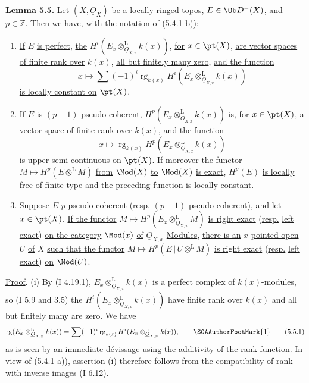 \textbf{Lemma 5.5.} \uline{Let} \((X,\underline{O}_X)\) \uline{be a locally ringed topos}, \(E\in\Ob D^{-}(X)\), \uline{and} \(p\in\mathbb Z\). \uline{Then we have}, \uline{with the notation of} (5.4.1 b)):
\begin{enumerate}[label=(\roman*)]
\item{}%
\uline{If} \(E\) \uline{is perfect}, \uline{the} \(H^i(E_x\otimes_{\underline{O}_{X,x}}^{\mathrm L}k(x))\), \uline{for} \(x\in\pt(X)\), \uline{are vector spaces of finite rank over} \(k(x)\), \uline{all but finitely many zero}, \uline{and the function}
\[
 x\longmapsto\sum(-1)^i\operatorname{rg}_{k(x)}H^i(E_x\otimes_{\underline{O}_{X,x}}^{\mathrm L}k(x))
\]
\uline{is locally constant on} \(\pt(X)\).
\item \uline{If} \(E\) \uline{is} \((p-1)\)-\uline{pseudo-coherent}, \(H^p(E_x\otimes_{\underline{O}_{X,x}}^{\mathrm L}k(x))\) \uline{is}, \uline{for} \(x\in\pt(X)\), \uline{a vector space of finite rank over} \(k(x)\), \uline{and the function}
\[
 x\longmapsto\operatorname{rg}_{k(x)}H^p(E_x\otimes_{\underline{O}_{X,x}}^{\mathrm L}k(x))
\]
\uline{is upper semi-continuous on} \(\pt(X)\). \uline{If moreover the functor} \(M\mapsto H^p(E\otimes^{\mathrm L}M)\) \uline{from} \(\Mod(X)\) \uline{to} \(\Mod(X)\) \uline{is exact}, \(H^p(E)\) \uline{is locally free of finite type and the preceding function is locally constant}.
\item \uline{Suppose} \(E\) \(p\)-\uline{pseudo-coherent} (\uline{resp.} \((p-1)\)-\uline{pseudo-coherent}), \uline{and let} \(x\in\pt(X)\). \uline{If the functor} \(M\mapsto H^p(E_x\otimes_{\underline{O}_{X,x}}^{\mathrm L}M)\) \uline{is right exact} (\uline{resp.} \uline{left exact}) \uline{on the category} \(\Mod(x)\) \uline{of} \(\underline{O}_{X,x}\)-\uline{Modules}, \uline{there is an} \(x\)-\uline{pointed open} \(U\) \uline{of} \(X\) \uline{such that the functor} \(M\mapsto H^p(E\,|\,U\otimes^{\mathrm L}M)\) \uline{is right exact} (\uline{resp.} \uline{left exact}) \uline{on} \(\Mod(U)\).
\end{enumerate}

\uline{Proof}. (i) By (I 4.19.1), \(E_x\otimes_{\underline{O}_{X,x}}^{\mathrm L}k(x)\) is a perfect complex of \(k(x)\)-modules, so (I 5.9 and 3.5) the \(H^i(E_x\otimes_{\underline{O}_{X,x}}^{\mathrm L}k(x))\) have finite rank over \(k(x)\) and all but finitely many are zero. We have
\begin{equation}
 \operatorname{rg}(E_x\otimes_{\underline{O}_{X,x}}^{\mathrm L}k(x))=\sum(-1)^i\operatorname{rg}_{k(x)}H^i(E_x\otimes_{\underline{O}_{X,x}}^{\mathrm L}k(x)),\qquad\mbox{\SGAAuthorFootMark{1}}\tag{5.5.1}
\end{equation}
%
as is seen by an immediate dévissage using the additivity of the rank function. In view of (5.4.1 a)), assertion (i) therefore follows from
%
the compatibility of rank with inverse images (I 6.12).

